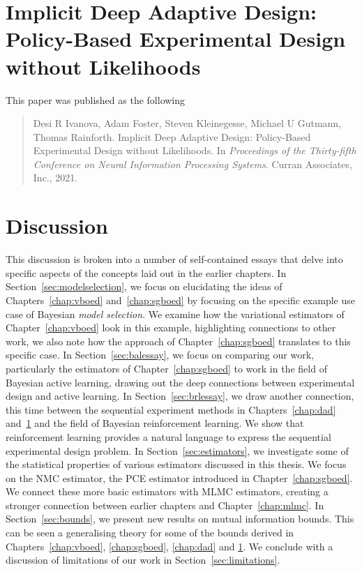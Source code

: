 \documentclass[a4paper, 10pt]{report}
\theoremstyle{plain}
\begin{document}
	\chapter{Implicit Deep Adaptive Design: Policy-Based Experimental Design without Likelihoods}
	\label{chap:idad}
	This paper was published as the following
	\begin{quote}
		Desi R Ivanova, Adam Foster, Steven Kleinegesse, Michael U Gutmann, Thomas Rainforth. Implicit Deep Adaptive Design: Policy-Based Experimental Design without Likelihoods. In \emph{Proceedings of the Thirty-fifth Conference on Neural Information Processing Systems}. Curran Associates, Inc., 2021.
	\end{quote}
	
	
	
	\chapter{Discussion}
	\label{chap:discussion}
	This discussion is broken into a number of self-contained essays that delve into specific aspects of the concepts laid out in the earlier chapters.
	In Section~\ref{sec:modelselection}, we focus on elucidating the ideas of Chapters~\ref{chap:vboed} and~\ref{chap:sgboed} by focusing on the specific example use case of Bayesian \emph{model selection}. We examine how the variational estimators of Chapter~\ref{chap:vboed} look in this example, highlighting connections to other work, we also note how the approach of Chapter~\ref{chap:sgboed} translates to this specific case.
	In Section~\ref{sec:balessay}, we focus on comparing our work, particularly the estimators of Chapter~\ref{chap:sgboed} to work in the field of Bayesian active learning, drawing out the deep connections between experimental design and active learning.
	In Section~\ref{sec:brlessay}, we draw another connection, this time between the sequential experiment methods in Chapters~\ref{chap:dad} and~\ref{chap:idad} and the field of Bayesian reinforcement learning. We show that reinforcement learning provides a natural language to express the sequential experimental design problem.
	In Section~\ref{sec:estimators}, we investigate some of the statistical properties of various estimators discussed in this thesis. We focus on the NMC estimator, the PCE estimator introduced in Chapter~\ref{chap:sgboed}. We connect these more basic estimators with MLMC estimators, creating a stronger connection between earlier chapters and Chapter~\ref{chap:mlmc}.
	In Section~\ref{sec:bounds}, we present new results on mutual information bounds. This can be seen a generalising theory for some of the bounds derived in Chapters~\ref{chap:vboed}, \ref{chap:sgboed}, \ref{chap:dad} and \ref{chap:idad}.
	We conclude with a discussion of limitations of our work in Section~\ref{sec:limitations}.
\end{document}
